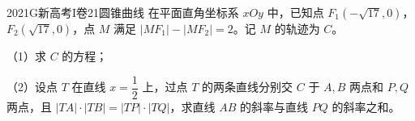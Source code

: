 
\begin{problem}{2021}{G}{新高考I卷}{21}{圆锥曲线}
在平面直角坐标系 $xOy$ 中，已知点 $F_1(-\sqrt{17},0)$，$F_2(\sqrt{17},0)$，点 $M$ 满足 $|MF_1|-|MF_2|=2$。记 $M$ 的轨迹为 $C$。

（1）求 $C$ 的方程；

（2）设点 $T$ 在直线 $x=\dfrac{1}{2}$ 上，过点 $T$ 的两条直线分别交 $C$ 于 $A,B$ 两点和 $P,Q$ 两点，且 $|TA|\cdot|TB|=|TP|\cdot|TQ|$，求直线 $AB$ 的斜率与直线 $PQ$ 的斜率之和。
\end{problem}
